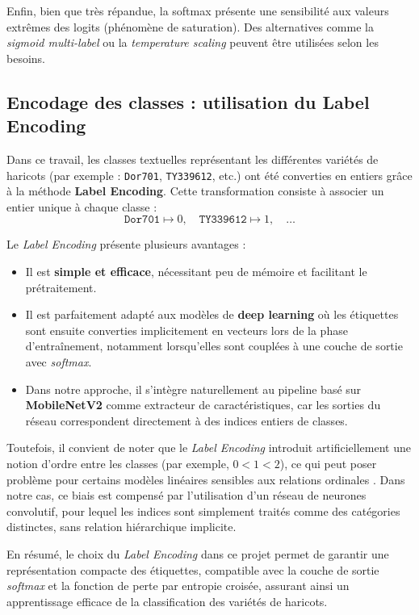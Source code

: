 Enfin, bien que très répandue, la softmax présente une sensibilité aux valeurs extrêmes des logits (phénomène de saturation). Des alternatives comme la \emph{sigmoid multi-label} ou la \emph{temperature scaling} peuvent être utilisées selon les besoins.

\subsection{Encodage des classes : utilisation du Label Encoding}
Dans ce travail, les classes textuelles représentant les différentes variétés de haricots (par exemple : \texttt{Dor701}, \texttt{TY339612}, etc.) ont été converties en entiers grâce à la méthode \textbf{Label Encoding}. Cette transformation consiste à associer un entier unique à chaque classe :
\[
    \texttt{Dor701} \mapsto 0, \quad
    \texttt{TY339612} \mapsto 1, \quad
    \dots
\]

Le \emph{Label Encoding} présente plusieurs avantages :
\begin{itemize}
    \item Il est \textbf{simple et efficace}, nécessitant peu de mémoire et facilitant le prétraitement.
    \item Il est parfaitement adapté aux modèles de \textbf{deep learning} où les étiquettes sont ensuite converties implicitement en vecteurs lors de la phase d’entraînement, notamment lorsqu’elles sont couplées à une couche de sortie avec \textit{softmax}.
    \item Dans notre approche, il s’intègre naturellement au pipeline basé sur \textbf{MobileNetV2} comme extracteur de caractéristiques, car les sorties du réseau correspondent directement à des indices entiers de classes.
\end{itemize}

Toutefois, il convient de noter que le \emph{Label Encoding} introduit artificiellement une notion d’ordre entre les classes (par exemple, $0 < 1 < 2$), ce qui peut poser problème pour certains modèles linéaires sensibles aux relations ordinales \cite{jones2020label}. Dans notre cas, ce biais est compensé par l’utilisation d’un réseau de neurones convolutif, pour lequel les indices sont simplement traités comme des catégories distinctes, sans relation hiérarchique implicite.

En résumé, le choix du \emph{Label Encoding} dans ce projet permet de garantir une représentation compacte des étiquettes, compatible avec la couche de sortie \textit{softmax} et la fonction de perte par entropie croisée, assurant ainsi un apprentissage efficace de la classification des variétés de haricots.

